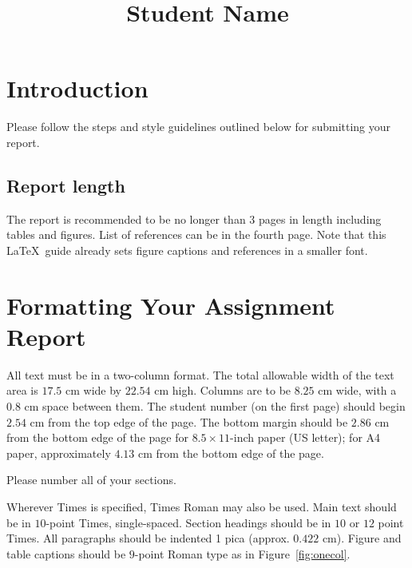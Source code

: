 \documentclass[10pt,twocolumn,letterpaper]{article}
\begin{document}
\title{Student Name}  %

\maketitle
\thispagestyle{empty}


\section{Introduction}

Please follow the steps and style guidelines outlined below for submitting your report.


\subsection{Report length}
The report is recommended to be no longer than 3 pages in length including tables and figures. List of references can be in the fourth page. Note that this \LaTeX\ guide already sets figure captions and references in a smaller font.

\section{Formatting Your Assignment Report}

All text must be in a two-column format. The total allowable width of the text area is $17.5$ cm wide by $22.54$ cm high. Columns are to be $8.25$ cm wide, with a $0.8$ cm space between them. The student number (on the first page) should begin $2.54$ cm from the top edge of the page.  The bottom margin should be $2.86$ cm from the bottom edge of the page for $8.5 \times 11$-inch paper (US letter); for A4 paper, approximately $4.13$ cm from the bottom edge of the page.

Please number all of your sections.

Wherever Times is specified, Times Roman may also be used.  Main text should be in $10$-point Times, single-spaced. Section headings should be in $10$ or $12$ point Times.  All paragraphs should be indented 1 pica (approx. $0.422$ cm).  Figure and table captions should be $9$-point Roman type as in 
Figure~\ref{fig:onecol}.
\end{document}
